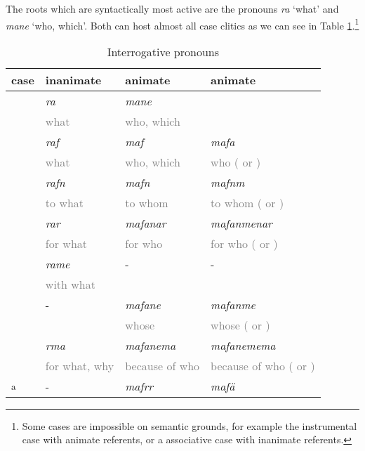 The roots which are syntactically most active are the  pronouns \emph{ra} `what' and \emph{mane} `who, which'. Both can host almost all case clitics as we can see in Table \ref{interrog}.\footnote{Some cases are impossible on semantic grounds, for example the instrumental case with animate referents, or a associative case with inanimate referents.}

\begin{table}
\caption{Interrogative pronouns}
\label{interrog}
	\begin{tabular}{llll}
		\lsptoprule
		{case} & {inanimate} & {animate} \Sg & {animate} \Nsg\\\midrule
		\Abs & \emph{ra}&\multicolumn{2}{|l|}{\hspace{2cm}\emph{mane}}\\
		&\textcolor{gray}{\footnotesize what} &\multicolumn{2}{|l|}{\hspace{2cm}\textcolor{gray}{\footnotesize who, which}}\\\cline{3-4}
		\Erg{} &\emph{raf}&\emph{maf} &\emph{mafa}\\
		& \textcolor{gray}{\footnotesize what} &\textcolor{gray}{\footnotesize who, which} &\textcolor{gray}{\footnotesize who (\Du{} or \Pl{})}\\
		\Dat &\emph{rafn}&\emph{mafn} &\emph{mafnm}\\
		&\textcolor{gray}{\footnotesize to what} &\textcolor{gray}{\footnotesize to whom} &\textcolor{gray}{\footnotesize to whom (\Du{} or \Pl{})}\\
		\Purp &\emph{rar}&\emph{mafanar} &\emph{mafanmenar}\\
		&\textcolor{gray}{\footnotesize for what} &\textcolor{gray}{\footnotesize for who} &\textcolor{gray}{\footnotesize for who (\Du{} or \Pl{})}\\
		\Ins &\emph{rame}&-&-\\
		&\textcolor{gray}{\footnotesize with what}&&\\
		\Poss &- &\emph{mafane} &\emph{mafanme}\\
		& &\textcolor{gray}{\footnotesize whose} &\textcolor{gray}{\footnotesize whose (\Du{} or \Pl{})}\\
		\Char &\emph{rma} &\emph{mafanema} &\emph{mafanemema}\\
		&\textcolor{gray}{\footnotesize for what, why}&\textcolor{gray}{\footnotesize because of who}&\textcolor{gray}{\footnotesize because of who (\Du{} or \Pl{})}\\
		\Assoc\textsuperscript{a} &- &\emph{mafrr} &\emph{mafä}\\

\end{tabular}
\end{table}
